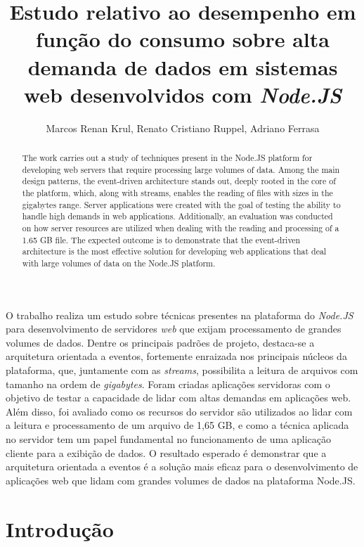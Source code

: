 \documentclass[12pt]{article}
\title{Estudo relativo ao desempenho em função do consumo sobre alta demanda de dados em sistemas web desenvolvidos com \textit{Node.JS}}
\author{Marcos Renan Krul\inst{1}, Renato Cristiano Ruppel\inst{1}, Adriano Ferrasa\inst{1}}
\begin{document}
 

\maketitle


\begin{resumo} 
O trabalho realiza um estudo sobre técnicas presentes na plataforma do \textit{Node.JS} para desenvolvimento de servidores \textit{web} 
que exijam processamento de grandes volumes de dados. Dentre os principais padrões de projeto, destaca-se a arquitetura orientada a eventos,
fortemente enraizada nos principais núcleos da plataforma, que, juntamente com as \textit{streams}, possibilita a leitura de arquivos 
com tamanho na ordem de \textit{gigabytes}. Foram criadas aplicações servidoras com o objetivo de testar a capacidade de lidar com altas 
demandas em aplicações web. Além disso, foi avaliado como os recursos do servidor são utilizados ao lidar com a leitura e processamento 
de um arquivo de 1,65 GB, e como a técnica aplicada no servidor tem um papel fundamental no funcionamento de uma aplicação cliente para a exibição de dados. 
O resultado esperado é demonstrar que a arquitetura orientada a eventos é a solução mais eficaz para o 
desenvolvimento de aplicações web que lidam com grandes volumes de dados na plataforma Node.JS.
\end{resumo}


\begin{abstract} 
The work carries out a study of techniques present in the Node.JS platform for developing web servers that require processing large
volumes of data. Among the main design patterns, the event-driven architecture stands out, deeply rooted in the core of the platform, 
which, along with streams, enables the reading of files with sizes in the gigabytes range. Server applications were created with the 
goal of testing the ability to handle high demands in web applications. Additionally, an evaluation was conducted on how server 
resources are utilized when dealing with the reading and processing of a 1.65 GB file. The expected outcome is to demonstrate that the 
event-driven architecture is the most effective solution for developing web applications that deal with large volumes of data on the Node.JS platform.
\end{abstract}


\section{Introdução}
\end{document}

